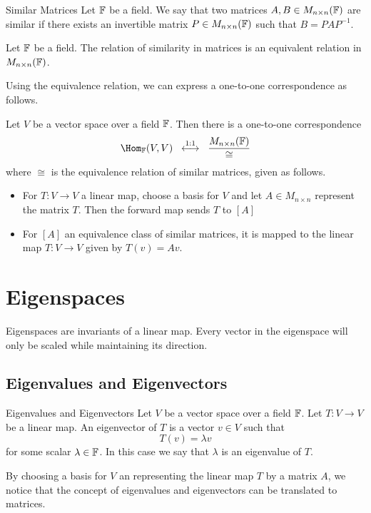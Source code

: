 \documentclass[a4paper]{article}
\begin{document}
\begin{defn}{Similar Matrices}{} Let $\mathbb{F}$ be a field. We say that two matrices $A,B\in M_{n\times n}(\mathbb{F})$ are similar if there exists an invertible matrix $P\in M_{n\times n}(\mathbb{F})$ such that $B=PAP^{-1}$. 
\end{defn}

\begin{lmm}{}{} Let $\mathbb{F}$ be a field. The relation of similarity in matrices is an equivalent relation in $M_{n\times n}(\mathbb{F})$. 
\end{lmm}

Using the equivalence relation, we can express a one-to-one correspondence as follows. 

\begin{thm}{}{} Let $V$ be a vector space over a field $\mathbb{F}$. Then there is a one-to-one correspondence $$\Hom_\F(V,V)\;\;\overset{1:1}{\longleftrightarrow}\;\;\frac{M_{n\times n}(\F)}{\cong}$$ where $\cong$ is the equivalence relation of similar matrices, given as follows. 
\begin{itemize}
\item For $T:V\to V$ a linear map, choose a basis for $V$ and let $A\in M_{n\times n}$ represent the matrix $T$. Then the forward map sends $T$ to $[A]$
\item For $[A]$ an equivalence class of similar matrices, it is mapped to the linear map $T:V\to V$ given by $T(v)=Av$. 
\end{itemize}
\end{thm}

\pagebreak
\section{Eigenspaces}
Eigenspaces are invariants of a linear map. Every vector in the eigenspace will only be scaled while maintaining its direction. 

\subsection{Eigenvalues and Eigenvectors}
\begin{defn}{Eigenvalues and Eigenvectors}{} Let $V$ be a vector space over a field $\mathbb{F}$. Let $T:V\to V$ be a linear map. An eigenvector of $T$ is a vector $v\in  V$ such that $$T(v)=\lambda v$$ for some scalar $\lambda\in\mathbb{F}$. In this case we say that $\lambda$ is an eigenvalue of $T$. 
\end{defn}

By choosing a basis for $V$ an representing the linear map $T$ by a matrix $A$, we notice that the concept of eigenvalues and eigenvectors can be translated to matrices. \\
\end{document}
